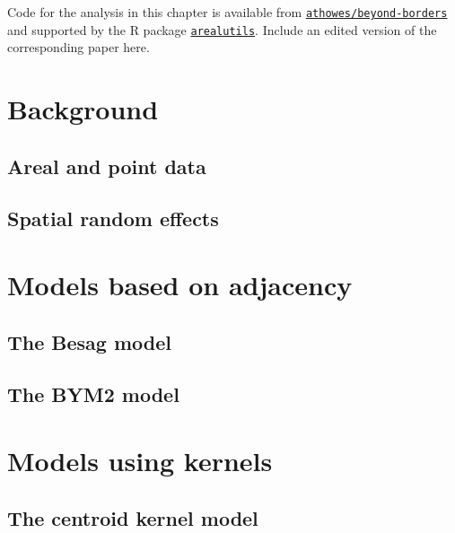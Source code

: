 \documentclass[a4paper, nobind]{templates/ociamthesis}
\begin{document}
\adjustmtc
{}

Code for the analysis in this chapter is available from \href{https://github.com/athowes/beyond-borders}{\texttt{athowes/beyond-borders}} and supported by the R package \href{https://athowes.github.io/arealutils}{\texttt{arealutils}}.
Include an edited version of the corresponding paper here.

\hypertarget{background-1}{%
\section{Background}\label{background-1}}

\hypertarget{areal-and-point-data}{%
\subsection{Areal and point data}\label{areal-and-point-data}}

\hypertarget{spatial-random-effects}{%
\subsection{Spatial random effects}\label{spatial-random-effects}}

\hypertarget{models-based-on-adjacency}{%
\section{Models based on adjacency}\label{models-based-on-adjacency}}

\hypertarget{the-besag-model}{%
\subsection{The Besag model}\label{the-besag-model}}

\hypertarget{the-bym2-model}{%
\subsection{The BYM2 model}\label{the-bym2-model}}

\hypertarget{models-using-kernels}{%
\section{Models using kernels}\label{models-using-kernels}}

\hypertarget{the-centroid-kernel-model}{%
\subsection{The centroid kernel model}\label{the-centroid-kernel-model}}
\end{document}
